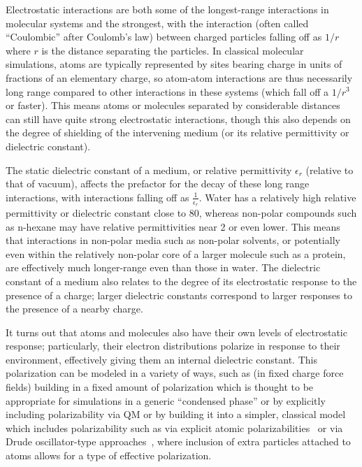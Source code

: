 \documentclass[9pt,bestpractices]{livecoms}
\begin{document}
Electrostatic interactions are both some of the longest-range interactions in molecular systems and the strongest, with the interaction (often called
``Coulombic'' after Coulomb's law) between charged particles falling off as $1/r$ where $r$ is the distance separating the particles. 
In classical molecular simulations, atoms are typically represented by sites bearing charge in units of fractions of an elementary charge, so atom-atom interactions are thus necessarily long range compared to other interactions in these systems (which fall off a $1/r^3$ or faster).  
This means atoms or molecules separated by considerable distances can still have quite strong electrostatic interactions, though this also depends on the degree of shielding of the intervening medium (or its relative permittivity or dielectric constant).

The static dielectric constant of a medium, or relative permittivity $\epsilon_r$ (relative to that of vacuum), affects the prefactor for the decay of these long range interactions, with interactions falling off as $\frac{1}{\epsilon_r}$. 
Water has a relatively high relative permittivity or dielectric constant close to 80, whereas non-polar compounds such as n-hexane may have relative permittivities near 2 or even lower. 
This means that interactions in non-polar media such as non-polar solvents, or potentially even within the relatively non-polar core of a larger molecule such as a protein, are effectively much longer-range even than those in water. 
The dielectric constant of a medium also relates to the degree of its electrostatic response to the presence of a charge; larger dielectric constants correspond to larger responses to the presence of a nearby charge.

It turns out that atoms and molecules also have their own levels of electrostatic response; particularly, their electron distributions polarize in response to their environment, effectively giving them an internal dielectric constant. 
This polarization can be modeled in a variety of ways, such as (in fixed charge force fields) building in a fixed amount of polarization which is thought to be appropriate for simulations in a generic ``condensed phase'' or by explicitly including polarizability via QM or by building it into a simpler, classical model which includes polarizability such as via explicit atomic polarizabilities~\cite{Ponder2003, Ponder:2010:JPhysChemB} or via Drude oscillator-type approaches~\cite{Lemkul:2016:ChemRev}, where inclusion of extra particles attached to atoms allows for a type of effective polarization.
\end{document}
